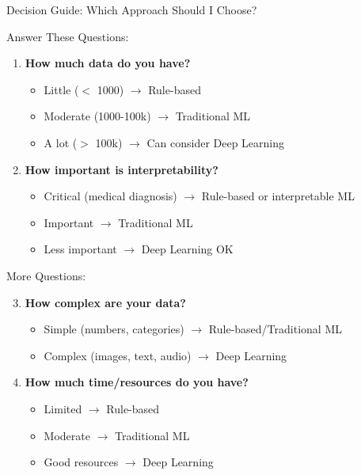 \documentclass[aspectratio=169, 10pt]{beamer}
\begin{document}
\begin{frame}{Decision Guide: Which Approach Should I Choose?}

    \begin{block}{\footnotesize Answer These Questions:}
        \footnotesize
        \begin{enumerate}
            \item \textbf{How much data do you have?}
            \begin{itemize}
                \item Little ($<$ 1000) $\rightarrow$ Rule-based
                \item Moderate (1000-100k) $\rightarrow$ Traditional ML
                \item A lot ($>$ 100k) $\rightarrow$ Can consider Deep Learning
            \end{itemize}
            \item \textbf{How important is interpretability?}
            \begin{itemize}
                \item Critical (medical diagnosis) $\rightarrow$ Rule-based or interpretable ML
                \item Important $\rightarrow$ Traditional ML
                \item Less important $\rightarrow$ Deep Learning OK
            \end{itemize}
        \end{enumerate}
    \end{block}

    \vspace{2mm}
    \begin{block}{\footnotesize More Questions:}
        \footnotesize
        \begin{enumerate}
            \setcounter{enumi}{2}
            \item \textbf{How complex are your data?}
            \begin{itemize}
                \item Simple (numbers, categories) $\rightarrow$ Rule-based/Traditional ML
                \item Complex (images, text, audio) $\rightarrow$ Deep Learning
            \end{itemize}
            \item \textbf{How much time/resources do you have?}
            \begin{itemize}
                \item Limited $\rightarrow$ Rule-based
                \item Moderate $\rightarrow$ Traditional ML
                \item Good resources $\rightarrow$ Deep Learning
            \end{itemize}
        \end{enumerate}
    \end{block}


\end{frame}
\end{document}
